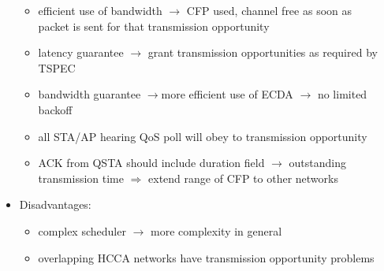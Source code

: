 \begin{itemize}
\begin{itemize}
        \item efficient use of bandwidth $\rightarrow$ CFP used, channel free as soon as\\packet is sent for that transmission opportunity
        \item latency guarantee $\rightarrow$ grant transmission opportunities as required by TSPEC
        \item bandwidth guarantee $\rightarrow$more efficient use of ECDA $\rightarrow$ no limited backoff
        \item all STA/AP hearing QoS poll will obey to transmission opportunity
        \item ACK from QSTA should include duration field $\rightarrow$ outstanding\\transmission time
        $\Rightarrow$ extend range of CFP to other networks
    \end{itemize}
    \item Disadvantages:
    \begin{itemize}
        \item complex scheduler $\rightarrow$ more complexity in general
        \item overlapping HCCA networks have transmission opportunity problems
    \end{itemize}
\end{itemize}

